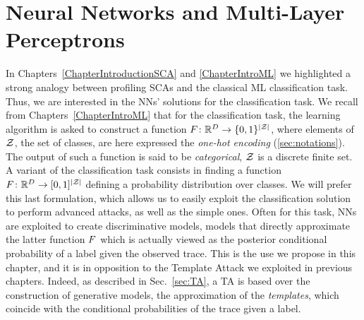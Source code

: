 \section{Neural Networks and Multi-Layer Perceptrons}\label{sec:MLP}
In Chapters~\ref{ChapterIntroductionSCA} and \ref{ChapterIntroML} we highlighted a strong analogy between profiling SCAs and the classical ML classification task. Thus, we are interested in the NNs' solutions for the classification task. We recall from Chapters~\ref{ChapterIntroML} that for the classification task, the learning algorithm is asked to construct a function $F\colon \mathbb{R}^D \rightarrow \{0,1\}^{\lvert\mathcal{Z}\rvert}$, where elements of $\mathcal{Z}$, \ie the set of classes, are here expressed \via the \emph{one-hot encoding} (\ref{sec:notations}). The output of such a function is said to be \emph{categorical}, \ie $\mathcal{Z}$ is a discrete finite set. A variant of the classification task consists in finding a function $F\colon \mathbb{R}^D \rightarrow [0,1]^{\lvert\mathcal{Z}\rvert}$ defining a probability distribution over classes. We will prefer this last formulation, which allows us to easily exploit the classification solution to perform advanced attacks, as well as the simple ones. Often for this task, NNs are exploited to create discriminative models, \ie models that directly approximate the latter function $F$ which is actually viewed as the posterior conditional probability of a label given the observed trace. This is the use we propose in this chapter, and it is in opposition to the Template Attack we exploited in previous chapters. Indeed, as described in Sec.~\ref{sec:TA}, a TA is based over the construction of generative models, \ie the approximation of the \emph{templates}, which coincide with the conditional probabilities of the trace given a label. \\

